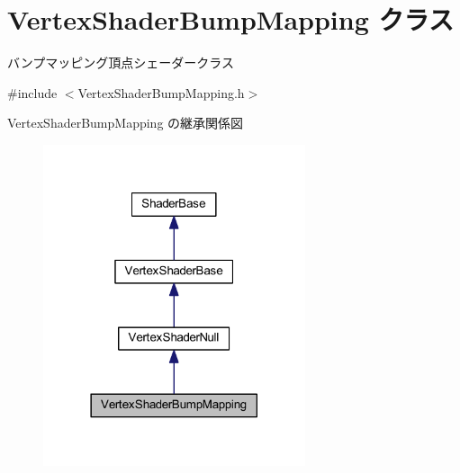 \hypertarget{class_vertex_shader_bump_mapping}{}\section{Vertex\+Shader\+Bump\+Mapping クラス}
\label{class_vertex_shader_bump_mapping}


バンプマッピング頂点シェーダークラス  




{\ttfamily \#include $<$Vertex\+Shader\+Bump\+Mapping.\+h$>$}



Vertex\+Shader\+Bump\+Mapping の継承関係図\nopagebreak
\begin{figure}[H]
\begin{center}
\leavevmode
\includegraphics[width=218pt]{class_vertex_shader_bump_mapping__inherit__graph}
\end{center}
\end{figure}
